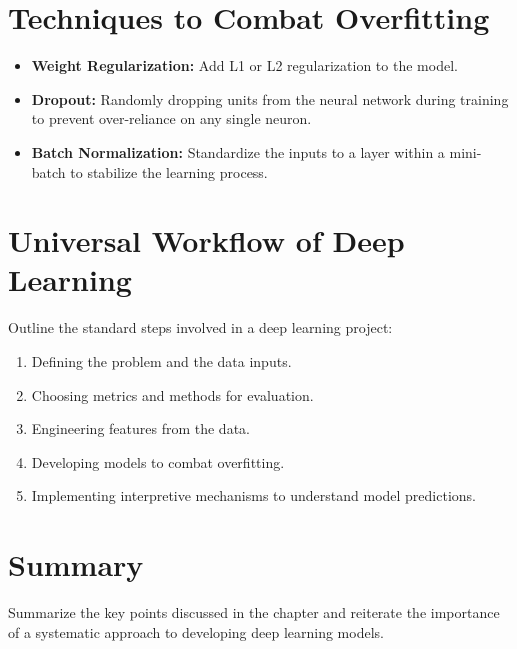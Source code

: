 \section{Techniques to Combat Overfitting}
\begin{itemize}
    \item \textbf{Weight Regularization:} Add L1 or L2 regularization to the model.
    \item \textbf{Dropout:} Randomly dropping units from the neural network during training to prevent over-reliance on any single neuron.
    \item \textbf{Batch Normalization:} Standardize the inputs to a layer within a mini-batch to stabilize the learning process.
\end{itemize}

\section{Universal Workflow of Deep Learning}
Outline the standard steps involved in a deep learning project:
\begin{enumerate}
    \item Defining the problem and the data inputs.
    \item Choosing metrics and methods for evaluation.
    \item Engineering features from the data.
    \item Developing models to combat overfitting.
    \item Implementing interpretive mechanisms to understand model predictions.
\end{enumerate}

\section{Summary}
Summarize the key points discussed in the chapter and reiterate the importance of a systematic approach to developing deep learning models.

